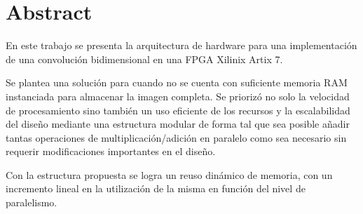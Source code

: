 % 
% 
%
\section*{\small Abstract}\label{objetivo_sec}
{\renewcommand\baselinestretch{1}\small
  En este trabajo se presenta la arquitectura de hardware para una implementación
  de una convolución bidimensional en una FPGA Xilinix Artix 7.

  Se plantea una solución para cuando no se cuenta con suficiente memoria RAM
  instanciada para almacenar la imagen completa. Se priorizó no solo la
  velocidad de procesamiento sino también un uso eficiente de los recursos y la
  escalabilidad del diseño mediante una estructura modular de forma tal que sea
  posible añadir tantas operaciones de multiplicación/adición en paralelo como
  sea necesario sin requerir modificaciones importantes en el diseño.

  Con la estructura propuesta se logra un reuso dinámico de memoria, con un
  incremento lineal en la utilización de la misma en función del nivel de
  paralelismo. \par}


